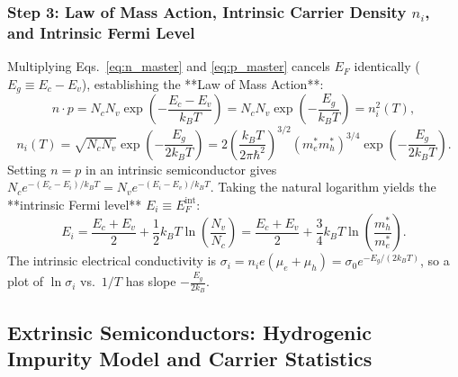 \documentclass[11pt,a4paper]{article}
\newcommand{\hb}{\hbar}
\newcommand{\hbarsq}{\hb^2}
\begin{document}
\subsubsection{Step 3: Law of Mass Action, Intrinsic Carrier Density \texorpdfstring{$n_i$}{n_i}, and Intrinsic Fermi Level}
Multiplying Eqs.~\eqref{eq:n_master} and \eqref{eq:p_master} cancels $E_F$ identically ($E_g \equiv E_c - E_v$), establishing the **Law of Mass Action**:
\begin{equation}
    \boxed{n \cdot p = N_c N_v \exp\left(-\frac{E_c - E_v}{k_B T}\right) = N_c N_v \exp\left(-\frac{E_g}{k_B T}\right) = n_i^2(T),}
    \label{eq:mass_action_master}
\end{equation}
\begin{equation}
    \boxed{n_i(T) = \sqrt{N_c N_v}\exp\left(-\frac{E_g}{2k_B T}\right) = 2\left(\frac{k_B T}{2\pi\hbarsq}\right)^{3/2}(m_e^* m_h^*)^{3/4}\exp\left(-\frac{E_g}{2k_B T}\right).}
    \label{eq:ni_master}
\end{equation}
Setting $n = p$ in an intrinsic semiconductor gives $N_c e^{-(E_c-E_i)/k_BT} = N_v e^{-(E_i-E_v)/k_BT}$. Taking the natural logarithm yields the **intrinsic Fermi level** $E_i \equiv E_F^{\mathrm{int}}$:
\begin{equation}
    \boxed{E_i = \frac{E_c + E_v}{2} + \frac{1}{2}k_B T \ln\left(\frac{N_v}{N_c}\right) = \frac{E_c + E_v}{2} + \frac{3}{4}k_B T \ln\left(\frac{m_h^*}{m_e^*}\right).}
    \label{eq:Ei_master}
\end{equation}
The intrinsic electrical conductivity is $\sigma_i = n_i e(\mu_e + \mu_h) = \sigma_0 e^{-E_g/(2k_B T)}$, so a plot of $\ln\sigma_i$ vs.\ $1/T$ has slope $-\frac{E_g}{2k_B}$.

\subsection{Extrinsic Semiconductors: Hydrogenic Impurity Model and Carrier Statistics}
\end{document}
